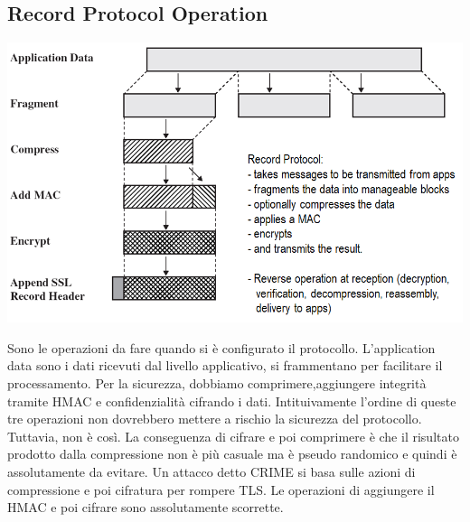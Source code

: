 \documentclass{book}
\theoremstyle{remark}
\begin{document}
\subsection{Record Protocol Operation}
\begin{center}
	\includegraphics[scale=0.5]{RecordProtocolOperation.png}
\end{center}
Sono le operazioni da fare quando si è configurato il protocollo\@.
L'application data sono i dati ricevuti dal livello applicativo, si frammentano per facilitare il processamento\@. Per la sicurezza, dobbiamo comprimere,aggiungere integrità tramite HMAC e confidenzialità cifrando i dati\@. Intituivamente l'ordine di queste tre operazioni non dovrebbero mettere a rischio la sicurezza del protocollo\@. Tuttavia, non è così\@.\newline
La conseguenza di cifrare e poi comprimere è che il risultato prodotto dalla compressione non è più casuale ma è pseudo randomico e quindi è assolutamente da evitare\@. Un attacco detto CRIME si basa sulle azioni di compressione e poi cifratura per rompere TLS\@.\newline
Le operazioni di aggiungere il HMAC e poi cifrare sono assolutamente scorrette\@.
\newpage
\end{document}
